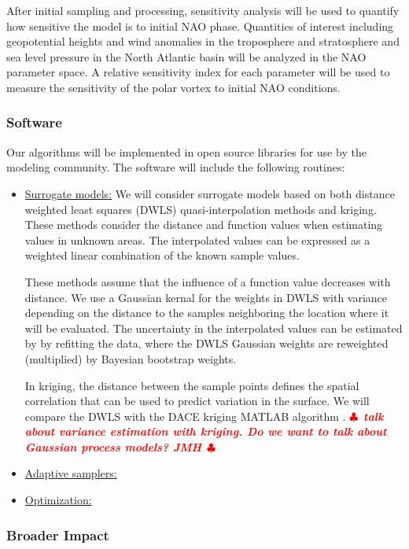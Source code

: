 \documentclass[11pt]{NSFamsart}
\newif\ifnotesw \noteswtrue
\newcommand{\notes}[1]{\ifnotesw \textcolor{red}{  $\clubsuit$\ {\sf \bf \it  #1}\ $\clubsuit$  }\fi}
\begin{document}
After initial sampling and processing, sensitivity analysis will be used to quantify how sensitive the model is to initial NAO phase. Quantities of interest including geopotential heights and wind anomalies in the troposphere and stratosphere and sea level pressure in the North Atlantic basin will be analyzed in the NAO parameter space. A relative sensitivity index for each parameter will be used to measure the sensitivity of the polar vortex to initial NAO conditions.


\subsubsection{Software}
Our algorithms will be implemented in open source libraries for use by the modeling community.  The software will include the following routines:
\begin{itemize}
\item \underline{Surrogate models:} We will consider surrogate models based on both distance weighted least squares (DWLS) quasi-interpolation methods and kriging.  
These methods consider the distance and function values when estimating values in unknown areas. The interpolated values can be expressed as a weighted linear combination of the known sample values. 

These methods assume that the influence of a function value decreases with distance.  We use a Gaussian kernal for the weights in DWLS with variance depending on the distance to the samples neighboring the location where it will be evaluated.
The uncertainty in the interpolated values can be estimated by  by refitting the data, where the DWLS Gaussian weights are reweighted (multiplied) by Bayesian bootstrap weights.  

In kriging,  the distance between the sample points defines the spatial correlation that can be used to predict variation in the surface. We will compare the DWLS with the DACE kriging MATLAB algorithm \cite{}. \notes{talk about variance estimation with kriging.  Do we want to talk about Gaussian process models? JMH}

\item \underline{Adaptive samplers:}

\item \underline{Optimization:}

\end{itemize}

\subsubsection{Broader Impact}
\end{document}
